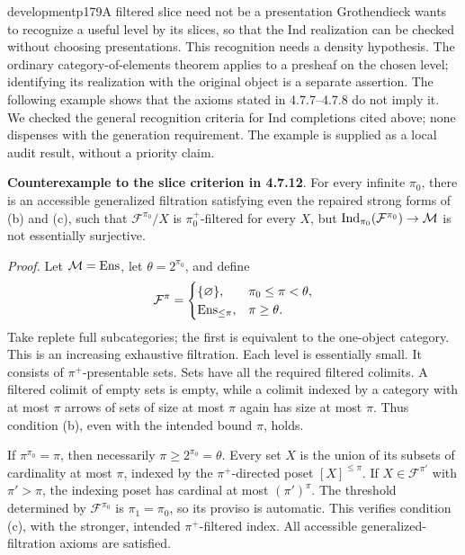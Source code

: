 \begin{dcomment}{development}{p179}{A filtered slice need not be a presentation}
Grothendieck wants to recognize a useful level by its slices, so that the Ind realization can be checked without choosing presentations. This recognition needs a density hypothesis. The ordinary category-of-elements theorem applies to a presheaf on the chosen level; identifying its realization with the original object is a separate assertion. The following example shows that the axioms stated in 4.7.7--4.7.8 do not imply it. We checked the general recognition criteria for Ind completions cited above; none dispenses with the generation requirement. The example is supplied as a local audit result, without a priority claim.

\textbf{Counterexample to the slice criterion in 4.7.12}\ours.
For every infinite $\pi_0$, there is an accessible generalized filtration satisfying even the repaired strong forms of (b) and (c), such that $\mathcal F^{\pi_0}/X$ is $\pi_0^+$-filtered for every $X$, but $\operatorname{Ind}_{\pi_0}(\mathcal F^{\pi_0})\to\mathcal M$ is not essentially surjective.

\textit{Proof.} Let $\mathcal M=\mathrm{Ens}$, let $\theta=2^{\pi_0}$, and define
\[
 \mathcal F^\pi=
 \begin{cases}
 \{\varnothing\},&\pi_0\leq\pi<\theta,\\
 \mathrm{Ens}_{\leq\pi},&\pi\geq\theta.
 \end{cases}
\]
Take replete full subcategories; the first is equivalent to the one-object category. This is an increasing exhaustive filtration. Each level is essentially small. It consists of $\pi^+$-presentable sets. Sets have all the required filtered colimits. A filtered colimit of empty sets is empty, while a colimit indexed by a category with at most $\pi$ arrows of sets of size at most $\pi$ again has size at most $\pi$. Thus condition (b), even with the intended bound $\pi$, holds.

If $\pi^{\pi_0}=\pi$, then necessarily $\pi\geq2^{\pi_0}=\theta$. Every set $X$ is the union of its subsets of cardinality at most $\pi$, indexed by the $\pi^+$-directed poset $[X]^{\leq\pi}$. If $X\in\mathcal F^{\pi'}$ with $\pi'>\pi$, the indexing poset has cardinal at most $(\pi')^\pi$. The threshold determined by $\mathcal F^{\pi_0}$ is $\pi_1=\pi_0$, so its proviso is automatic. This verifies condition (c), with the stronger, intended $\pi^+$-filtered index. All accessible generalized-filtration axioms are satisfied.


\end{dcomment}
